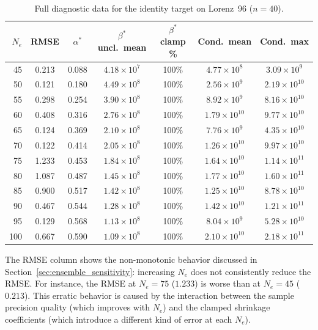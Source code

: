 \begin{table}[htbp]
\centering
\caption{Full diagnostic data for the identity target on Lorenz~96 ($n = 40$).}
\label{tab:diag_identity}
\begin{tabular}{@{}rcccccc@{}}
\toprule
$N_e$ & RMSE & $\alpha^*$ & $\beta^*$ uncl.\ mean & $\beta^*$ clamp \% & Cond.\ mean & Cond.\ max \\
\midrule
45  & 0.213 & 0.088 & $4.18 \times 10^7$  & 100\% & $4.77 \times 10^8$  & $3.09 \times 10^9$ \\
50  & 0.121 & 0.180 & $4.49 \times 10^8$  & 100\% & $2.56 \times 10^9$  & $2.19 \times 10^{10}$ \\
55  & 0.298 & 0.254 & $3.90 \times 10^8$  & 100\% & $8.92 \times 10^9$  & $8.16 \times 10^{10}$ \\
60  & 0.408 & 0.316 & $2.76 \times 10^8$  & 100\% & $1.79 \times 10^{10}$ & $9.77 \times 10^{10}$ \\
65  & 0.124 & 0.369 & $2.10 \times 10^8$  & 100\% & $7.76 \times 10^9$  & $4.35 \times 10^{10}$ \\
70  & 0.122 & 0.414 & $2.05 \times 10^8$  & 100\% & $1.26 \times 10^{10}$ & $9.97 \times 10^{10}$ \\
75  & 1.233 & 0.453 & $1.84 \times 10^8$  & 100\% & $1.64 \times 10^{10}$ & $1.14 \times 10^{11}$ \\
80  & 1.087 & 0.487 & $1.45 \times 10^8$  & 100\% & $1.77 \times 10^{10}$ & $1.60 \times 10^{11}$ \\
85  & 0.900 & 0.517 & $1.42 \times 10^8$  & 100\% & $1.25 \times 10^{10}$ & $8.78 \times 10^{10}$ \\
90  & 0.467 & 0.544 & $1.28 \times 10^8$  & 100\% & $1.42 \times 10^{10}$ & $1.21 \times 10^{11}$ \\
95  & 0.129 & 0.568 & $1.13 \times 10^8$  & 100\% & $8.04 \times 10^9$  & $5.28 \times 10^{10}$ \\
100 & 0.667 & 0.590 & $1.09 \times 10^8$  & 100\% & $2.10 \times 10^{10}$ & $2.18 \times 10^{11}$ \\
\bottomrule
\end{tabular}
\end{table}

The RMSE column shows the non-monotonic behavior discussed in Section~\ref{sec:ensemble_sensitivity}: increasing $N_e$ does not consistently reduce the RMSE. For instance, the RMSE at $N_e = 75$ ($1.233$) is worse than at $N_e = 45$ ($0.213$). This erratic behavior is caused by the interaction between the sample precision quality (which improves with $N_e$) and the clamped shrinkage coefficients (which introduce a different kind of error at each $N_e$).

